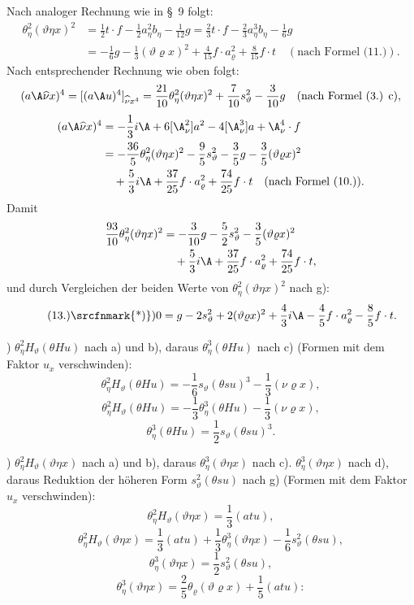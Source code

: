 Nach analoger Rechnung wie in \S\ 9 folgt:
\[
\begin{aligned}
\theta_\eta^2(\vartheta\eta x)^2
&=\frac12t\cdot f-\frac12a_\eta^2b_\eta-\frac1{12}g=\frac23t\cdot f-\frac23a_\eta^3b_\eta-\frac16g\\
&=-\frac16g-\frac13(\vartheta\varrho x)^2+\frac4{15}f\cdot a_\varrho^2+\frac8{15}f\cdot t\quad(\text{nach Formel (11.)}).
\end{aligned}
\]
Nach entsprechender Rechnung wie oben folgt:
\[
(a\A\widehat{\nu}x)^4=[(a\A u)^4]_{\widehat{\nu}x^4}=\frac{21}{10}\theta_\eta^2(\vartheta\eta x)^2+\frac7{10}s_\vartheta^2-\frac3{10}g
\quad(\text{nach Formel (3.) c}),
\]
\[
\begin{aligned}
(a\A\widehat{\nu}x)^4&=-\frac13i\A+6[\A_\nu^2]a^2-4[\A_\nu^3]a+\A_\nu^4\cdot f\\
&=-\frac{36}{5}\theta_\eta^2(\vartheta\eta x)^2-\frac95s_\vartheta^2-\frac35g-\frac35(\vartheta\varrho x)^2\\
&\quad+\frac53i\A+\frac{37}{25}f\cdot a_\varrho^2+\frac{74}{25}f\cdot t\quad(\text{nach Formel (10.)}).
\end{aligned}
\]
Damit
\[
\begin{aligned}
\frac{93}{10}\theta_\eta^2(\vartheta\eta x)^2
&=-\frac3{10}g-\frac52s_\vartheta^2-\frac35(\vartheta\varrho x)^2\\
&\quad+\frac53i\A+\frac{37}{25}f\cdot a_\varrho^2+\frac{74}{25}f\cdot t,
\end{aligned}
\]
und durch Vergleichen der beiden Werte von $\theta_\eta^2(\vartheta\eta x)^2$ nach g):
\[
\tag{13.)\srcfnmark{*)}}
0=g-2s_\vartheta^2+2(\vartheta\varrho x)^2+\frac43i\A-\frac45f\cdot a_\varrho^2-\frac85f\cdot t.
\]

) $\theta_\eta^2H_\vartheta(\theta Hu)$ nach a) und b), daraus $\theta_\eta^3(\theta Hu)$ nach c) (Formen mit dem Faktor $u_x$ verschwinden):
\[
\theta_\eta^2H_\vartheta(\theta Hu)=-\frac16s_\vartheta(\theta su)^3-\frac13(\nu\varrho x),
\]
\[
\theta_\eta^2H_\vartheta(\theta Hu)=-\frac13\theta_\eta^3(\theta Hu)-\frac13(\nu\varrho x),
\]
\[
\theta_\eta^3(\theta Hu)=\frac12s_\vartheta(\theta su)^3.
\]

) $\theta_\eta^2H_\vartheta(\vartheta\eta x)$ nach a) und b), daraus $\theta_\eta^3(\vartheta\eta x)$ nach c). $\theta_\eta^3(\vartheta\eta x)$ nach d), daraus Reduktion der höheren Form $s_\vartheta^2(\theta su)$ nach g) (Formen mit dem Faktor $u_x$ verschwinden):
\[
\theta_\eta^2H_\vartheta(\vartheta\eta x)=\frac13(atu),
\]
\[
\theta_\eta^2H_\vartheta(\vartheta\eta x)=\frac13(atu)+\frac13\theta_\eta^3(\vartheta\eta x)-\frac16s_\vartheta^2(\theta su),
\]
\[
\theta_\eta^3(\vartheta\eta x)=\frac12s_\vartheta^2(\theta su),
\]
\[
\theta_\eta^3(\vartheta\eta x)=\frac25\theta_\varrho(\vartheta\varrho x)+\frac15(atu):
\]

